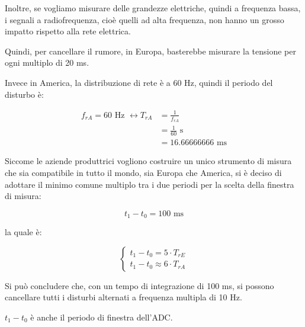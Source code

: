 Inoltre, se vogliamo misurare delle grandezze elettriche, quindi a frequenza bassa, i segnali a radiofrequenza, cioè quelli ad alta frequenza, 
non hanno un grosso impatto rispetto alla rete elettrica. \newline 

Quindi, per cancellare il rumore, in Europa, basterebbe misurare la tensione per ogni multiplo di 20 ms. \newline 

Invece in America, la distribuzione di rete è a 60 Hz, quindi il periodo del disturbo è: 

{
    \Large 
    \begin{equation}
        \begin{split}
            f_{rA} = 60 \text{ Hz } 
            \leftrightarrow 
            T_{rA} 
            &=  \frac{1}{f_{rA}}
            \\
            &= \frac{1}{60} \text{ s }
            \\ 
            &= 16.66666666 \text{ ms}
        \end{split}
    \end{equation}
}

Siccome le aziende produttrici vogliono costruire un unico strumento di misura che sia compatibile in tutto il mondo, sia Europa che America, 
si è deciso di adottare il minimo comune multiplo tra i due periodi per la scelta della finestra di misura: 

{
    \Large 
    \begin{equation}
        t_1 - t_0 = 100 \text{ ms}
    \end{equation}
}

la quale è: 

{
    \Large 
    \begin{equation}
        \begin{cases}
            t_1 - t_0 = 5 \cdot T_{rE}
            \\
            t_1 - t_0 \approx 6 \cdot T_{rA}
        \end{cases}
    \end{equation}
}

Si può concludere che, con un tempo di integrazione di 100 ms, si possono cancellare tutti i disturbi alternati a frequenza multipla di 10 Hz. \newline 

$t_1 - t_0$ è anche il periodo di finestra dell'ADC. \newline

\newpage 


